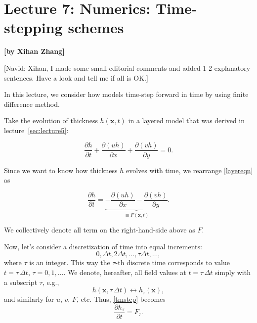 
\section{Lecture 7: Numerics: Time-stepping schemes}
\begin{flushright}\textbf{[by Xihan Zhang]}\end{flushright}

{\color{red}[Navid: Xihan, I made some small editorial comments and added 1-2 explanatory sentences. Have a look and tell me if all is OK.]}

In this lecture, we consider how models time-step forward in time by using finite difference method. 


Take the evolution of thickness $h(\boldsymbol{x}, t)$ in a layered model that was derived in lecture~\ref{sec:lecture5}: 

\begin{equation}
\frac{\partial h}{\partial t}+\frac{\partial (uh)}{\partial x}+\frac{\partial (vh)}{\partial y}=0 .
\label{layereqn}
\end{equation}

Since we want to know how thickness $h$ evolves with time, we rearrange \eqref{layereqn} as 

\begin{equation}
\frac{\partial h}{\partial t}=\underbrace{-\frac{\partial(uh)}{\partial x}-\frac{\partial (vh)}{\partial y}}_{\equiv F(\boldsymbol{x}, t)}.
\label{tmstep}
\end{equation}

We collectively denote all term on the right-hand-side above as $F$.

Now, let's consider a discretization of time into equal increments:
\begin{equation}
	0, \Delta t, 2 \Delta t, \dots, \tau \Delta t, \dots, \label{eq7.3}
\end{equation}
where $\tau$ is an integer. This way the $\tau$-th discrete time corresponds to value $t=\tau\,\Delta t$, $\tau=0,1,\dots$. We denote, hereafter, all field values at $t=\tau\,\Delta t$ simply with a subscript $\tau$, e.g.,
\begin{equation}
	h(\boldsymbol{x}, \tau\,\Delta t) \leftrightarrow h_\tau(\boldsymbol{x}),
\end{equation}
and similarly for $u$, $v$, $F$, etc. Thus, \eqref{tmstep} becomes
\begin{equation}
	\frac{\partial h_\tau}{\partial t} = F_\tau. \label{Ftau}
\end{equation}

